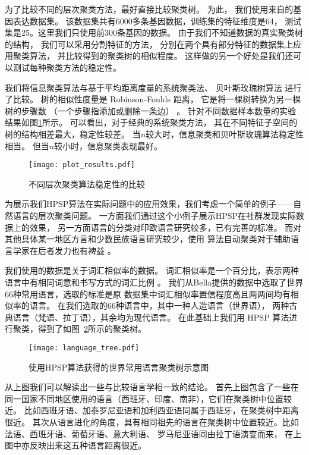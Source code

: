 为了比较不同的层次聚类方法，最好直接比较聚类树。
为此，
我们使用来自\citet{khan2001classification}的基因表达数据集。
该数据集共有6000多条基因数据，训练集的特征维度是64，
测试集是25。这里我们只使用前300条基因的数据。
由于我们不知道数据的真实聚类树的结构，
我们可以采用分割特征的方法，
分别在两个具有部分特征的数据集上应用聚类算法，
并比较得到的聚类树的相似程度。
这样做的另一个好处是我们还可以测试每种聚类方法的稳定性。

我们将信息聚类算法与基于平均距离度量的系统聚类法、
贝叶斯玫瑰树算法
\cite{blundell2011discovering}
进行了比较。
树的相似性度量是 Robinson-Foulds 距离，
它是将一棵树转换为另一棵树的步骤数
（一个步骤指添加或删除一条边）
\citep{day1985optimal}。
针对不同数据样本数量的实验
结果如图\ref{fig:shc}所示。
可以看出，对于经典的系统聚类方法，
其在不同特征子空间的树的结构相差最大，稳定性较差。
当$n$较大时，信息聚类和贝叶斯玫瑰算法稳定性相当。
但当$n$较小时，信息聚类表现最好。

\begin{figure}[!ht]
\centering
\texttt{[image: plot\_results.pdf]}
\caption{不同层次聚类算法稳定性的比较}\label{fig:shc}
\end{figure}

为展示我们HPSP算法在实际问题中的应用效果，我们考虑一个简单的例子——自然语言的层次聚类问题。
一方面我们通过这个小例子展示HPSP在社群发现实际数据上的效果，
另一方面语言的分类对印欧语言研究较多，已有完善的标准。 
而对其他具体某一地区方言和少数民族语言研究较少，使用
算法自动聚类对于辅助语言学家在后者发力也有裨益 \cite{nasution2019visualizing}。

我们使用的数据是关于词汇相似率的数据。
词汇相似率是一个百分比，表示两种语言中有相同词意和书写方式的词汇比例
\cite{bella2021database}。
我们从Bella提供的数据中选取了世界66种常用语言，选取的标准是原
数据集中词汇相似率置信程度高且两两间均有相似率的语言。
在我们选取的66种语言中，其中一种人造语言（世界语），
两种古典语言（梵语、拉丁语），其余均为现代语言。
在此基础上我们用 HPSP 算法进行聚类，得到了如图~\ref{fig:language_tree}所示的聚类树。
\begin{figure}[!ht]
    \centering
    \texttt{[image: language\_tree.pdf]}
    \caption{使用HPSP算法获得的世界常用语言聚类树示意图}\label{fig:language_tree}
\end{figure}

从上图我们可以解读出一些与比较语言学相一致的结论。
首先上图包含了一些在同一国家不同地区使用的语言（西班牙、印度、南非），它们在聚类树中位置较近。
比如西班牙语、加泰罗尼亚语和加利西亚语同属于西班牙，在聚类树中距离很近。
其次从语言进化的角度，具有相同祖先的语言在聚类树中位置较近。比如法语、西班牙语、葡萄牙语、意大利语、
罗马尼亚语同由拉丁语演变而来，
在上图中亦反映出来这五种语言距离很近。


